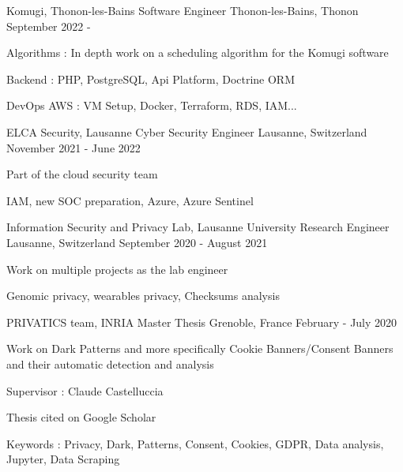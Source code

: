 


\begin{cventries}
	
	\cventry
	{Komugi, Thonon-les-Bains} %
	{Software Engineer} %
	{Thonon-les-Bains, Thonon} %
	{September 2022 - } %
	{ %
		\begin{cvitems}
			\item {Algorithms : In depth work on a scheduling algorithm for the Komugi software}
			\item {Backend : PHP, PostgreSQL, Api Platform, Doctrine ORM}
			\item {DevOps AWS : VM Setup, Docker, Terraform, RDS, IAM...}
		\end{cvitems}
	}
	
	\cventry
	{ELCA Security, Lausanne} %
	{Cyber Security Engineer} %
	{Lausanne, Switzerland} %
	{November 2021 - June 2022} %
	{ %
		\begin{cvitems}
			\item {Part of the cloud security team}
			\item {IAM, new SOC preparation, Azure, Azure Sentinel}
		\end{cvitems}
	}
	
	\cventry
	{Information Security and Privacy Lab, Lausanne University} %
	{Research Engineer} %
	{Lausanne, Switzerland} %
	{September 2020 - August 2021} %
	{ %
		\begin{cvitems}
			\item {Work on multiple projects as the lab engineer}
			\item {Genomic privacy, wearables privacy, Checksums analysis}
		\end{cvitems}
	}
	
	\cventry
	{PRIVATICS team, INRIA} %
	{Master Thesis} %
	{Grenoble, France} %
	{February - July 2020} %
	{ %
		\begin{cvitems}
			\item {Work on Dark Patterns and more specifically Cookie Banners/Consent Banners and their automatic detection and analysis}
			\item {Supervisor : Claude Castelluccia}
			\item{Thesis cited on Google Scholar}
			\item {Keywords : Privacy, Dark, Patterns, Consent, Cookies, GDPR, Data analysis, Jupyter, Data Scraping}
		\end{cvitems}
	}
	

\end{cventries}
